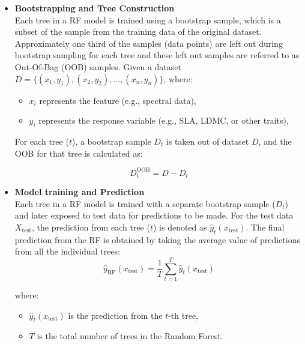 \documentclass[12pt,a4paper]{report}
\begin{document}
\begin{itemize}
    \item \textbf{Bootstrapping and Tree Construction} \\
    Each tree in a RF model is trained using a bootstrap sample, which is a subset of the sample from the training data of the original dataset. Approximately one third of the samples (data points) are left out during bootstrap sampling for each tree and these left out samples are referred to as Out-Of-Bag (OOB) samples.
    Given a dataset \( D = \{ (x_1, y_1), (x_2, y_2), \dots, (x_n, y_n) \} \), where:
    \begin{itemize}
        \item \( x_i \) represents the feature (e.g., spectral data),
        \item \( y_i \) represents the response variable (e.g., SLA, LDMC, or other traits),
    \end{itemize}
    For each tree (\( t \)), a bootstrap sample \( D_t \) is taken out of dataset \( D \), and the OOB for that tree is calculated as:

    \begin{equation}
        D_t^{\text{OOB}} = D \mathbin{-} D_t 
    \end{equation}
    

    
    \item \textbf{Model training and Prediction} \\
    Each tree in a RF model is trained with a separate bootstrap sample (\( D_t \)) and later exposed to test data for predictions to be made.
    For the test data \( X_{\text{test}} \), the prediction from each tree (\( t \)) is denoted as \( \hat{y}_t(x_{\text{test}}) \). The final prediction from the RF is obtained by taking the average value of predictions from all the individual trees: \\

    \begin{equation}
        \hat{y}_{\text{RF}}(x_{\text{test}}) = \frac{1}{T} \sum_{t=1}^{T} \hat{y}_t(x_{\text{test}})
    \end{equation}
    
    where:
    \begin{itemize}
        \item \( \hat{y}_t(x_{\text{test}}) \) is the prediction from the \( t \)-th tree,
        \item \( T \) is the total number of trees in the Random Forest.
    \end{itemize}
\end{itemize}
\end{document}
